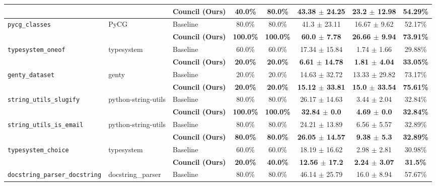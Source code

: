 \begin{table}[t]
\begin{tabular}{lll c c c c c}
 & & \textbf{Council (Ours)} & \textbf{40.0\%} & \textbf{80.0\%} & \textbf{43.38 $\pm$ 24.25} & \textbf{23.2 $\pm$ 12.98} & \textbf{54.29\%} \\
\midrule
\multirow{2}{*}{\texttt{pycg\_classes}} & \multirow{2}{*}{PyCG} & Baseline & 80.0\% & 80.0\% & 41.3 $\pm$ 23.11 & 16.67 $\pm$ 9.62 & 52.17\% \\
 & & \textbf{Council (Ours)} & \textbf{100.0\%} & \textbf{100.0\%} & \textbf{60.0 $\pm$ 7.78} & \textbf{26.66 $\pm$ 9.94} & \textbf{73.91\%} \\
\midrule
\multirow{2}{*}{\texttt{typesystem\_oneof}} & \multirow{2}{*}{typesystem} & Baseline & 60.0\% & 60.0\% & 17.34 $\pm$ 15.84 & 1.74 $\pm$ 1.66 & 29.88\% \\
 & & \textbf{Council (Ours)} & \textbf{20.0\%} & \textbf{20.0\%} & \textbf{6.61 $\pm$ 14.78} & \textbf{1.81 $\pm$ 4.04} & \textbf{33.05\%} \\
\midrule
\multirow{2}{*}{\texttt{genty\_dataset}} & \multirow{2}{*}{genty} & Baseline & 20.0\% & 20.0\% & 14.63 $\pm$ 32.72 & 13.33 $\pm$ 29.82 & 73.17\% \\
 & & \textbf{Council (Ours)} & \textbf{20.0\%} & \textbf{20.0\%} & \textbf{15.12 $\pm$ 33.81} & \textbf{15.0 $\pm$ 33.54} & \textbf{75.61\%} \\
\midrule
\multirow{2}{*}{\texttt{string\_utils\_slugify}} & \multirow{2}{*}{python-string-utils} & Baseline & 80.0\% & 80.0\% & 26.17 $\pm$ 14.63 & 3.44 $\pm$ 2.04 & 32.84\% \\
 & & \textbf{Council (Ours)} & \textbf{100.0\%} & \textbf{100.0\%} & \textbf{32.84 $\pm$ 0.0} & \textbf{4.69 $\pm$ 0.0} & \textbf{32.84\%} \\
\midrule
\multirow{2}{*}{\texttt{string\_utils\_is\_email}} & \multirow{2}{*}{python-string-utils} & Baseline & 80.0\% & 80.0\% & 24.21 $\pm$ 13.89 & 6.56 $\pm$ 5.57 & 32.89\% \\
 & & \textbf{Council (Ours)} & \textbf{80.0\%} & \textbf{80.0\%} & \textbf{26.05 $\pm$ 14.57} & \textbf{9.38 $\pm$ 5.3} & \textbf{32.89\%} \\
\midrule
\multirow{2}{*}{\texttt{typesystem\_choice}} & \multirow{2}{*}{typesystem} & Baseline & 60.0\% & 60.0\% & 18.19 $\pm$ 16.62 & 2.98 $\pm$ 2.81 & 30.98\% \\
 & & \textbf{Council (Ours)} & \textbf{20.0\%} & \textbf{40.0\%} & \textbf{12.56 $\pm$ 17.2} & \textbf{2.24 $\pm$ 3.07} & \textbf{31.5\%} \\
\midrule
\multirow{2}{*}{\texttt{docstring\_parser\_docstring}} & \multirow{2}{*}{docstring\_parser} & Baseline & 80.0\% & 80.0\% & 46.14 $\pm$ 25.79 & 16.0 $\pm$ 8.94 & 57.67\% \\

\end{tabular}
\end{table}
